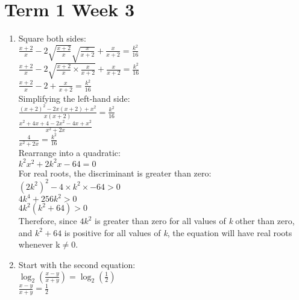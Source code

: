 \documentclass[../main.tex]{subfiles}
\begin{document}
\section*{Term 1 Week 3}
\begin{enumerate}
    \item 
    Square both sides:\\
    \(\frac{x+2}{x}-2\sqrt{\frac{x+2}{x}} \sqrt{\frac{x}{x+2}}+\frac{x}{x+2}=\frac{k^2}{16}\)\\

    \(\frac{x+2}{x}-2\sqrt{\frac{x+2}{x}\times \frac{x}{x+2}}+\frac{x}{x+2}=\frac{k^2}{16}\)\\

    \(\frac{x+2}{x}-2+\frac{x}{x+2}=\frac{k^2}{16}\)\\

    Simplifying the left-hand side:\\
    \(\frac{(x+2)^2-2x(x+2)+x^2}{x(x+2)}=\frac{k^2}{16}\)\\

    \(\frac{x^2+4x+4-2x^2-4x+x^2}{x^2+2x}\)\\

    \(\frac{4}{x^2+2x}=\frac{k^2}{16}\)\\

    Rearrange into a quadratic:\\
    \(k^2x^2+2k^2x-64=0\)\\

    For real roots, the discriminant is greater than zero:\\
    \((2k^2)^2-4\times k^2 \times -64>0\)\\

    \(4k^4+256k^2>0\)\\

    \(4k^2(k^2+64)>0\)\\

    Therefore, since \(4k^2\) is greater than zero for all values of \textit{k} other than zero, and \(k^2+64\) is positive for all values of \textit{k}, the equation will have real roots whenever k\(\neq\)0.\\
    
    \item 
    Start with the second equation:\\
    \(\log_2(\frac{x-y}{x+y})=\log_2(\frac{1}{2})\)\\

    \(\frac{x-y}{x+y}=\frac{1}{2}\)\\


\end{enumerate}
\end{document}
